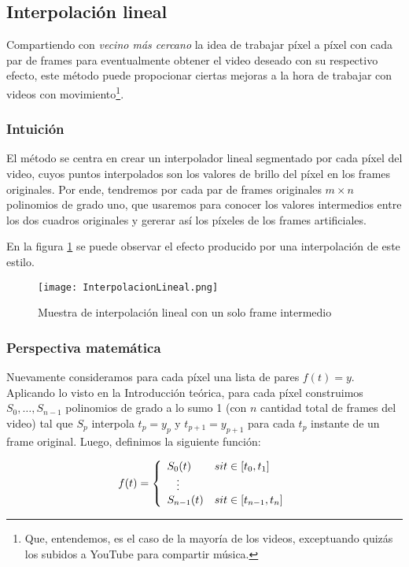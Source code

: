 \subsection{Interpolaci\'on lineal}

Compartiendo con \emph{vecino m\'as cercano} la idea de trabajar píxel a píxel con cada par de frames para eventualmente obtener el video deseado con su respectivo efecto, este método puede propocionar ciertas mejoras a la hora de trabajar con videos con movimiento\footnote{Que, entendemos, es el caso de la mayoría de los videos, exceptuando quizás los subidos a YouTube para compartir música.}.

\subsubsection*{\bf{Intuición}}
El m\'etodo se centra en crear un interpolador lineal segmentado por cada píxel del video, cuyos puntos interpolados son los valores de brillo del píxel en los frames originales. Por ende, tendremos por cada par de frames originales $m \times n$ polinomios de grado uno, que usaremos para conocer los valores intermedios entre los dos cuadros originales y gererar así los píxeles de los frames artificiales.

En la figura \ref{fig:lineal} se puede observar el efecto producido por una interpolación de este estilo.

\begin{figure}[h!]
  \centering
    \texttt{[image: InterpolacionLineal.png]}
     \caption{Muestra de interpolaci\'on lineal con un solo frame intermedio}\label{fig:lineal}
\end{figure}
\noindent

\subsubsection*{\bf{Perspectiva matem\'atica}}
Nuevamente consideramos para cada píxel una lista de pares $f(t)=y$. Aplicando lo visto en la Introducción teórica, para cada píxel construimos $S_0, \ldots, S_{n - 1}$ polinomios de grado a lo sumo 1 (con $n$ cantidad total de frames del video) tal que $S_p$ interpola $t_p=y_p$ y $t_{p + 1}=y_{p+1}$ para cada $t_p$ instante de un frame original. Luego, definimos la siguiente funci\'on:
 
\[
f(t) = 
\left\{
    \begin{array}{ll}
        S_0(t)  & \mbox{si } t \in [t_{0}, t_1] \\
        \hspace{0.3cm}\vdots \\     
        S_{n - 1}(t) & \mbox{si } t \in [t_{n - 1}, t_n]
    \end{array}
\right.
\]

